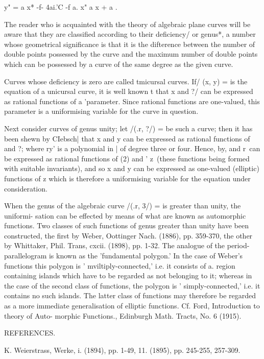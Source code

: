 {y" = a x* -f- 4ai.'C -f a. x" a x + a .

The reader who is acquainted with the theory of algebraic plane curves
will be aware that they are classified according to their deficiency/
or genus*, a number whose geometrical significance is that it is the
difterence between the number of double points possessed by the curve
and the maximum number of double points which can be possessed by a
curve of the same degree as the given curve.

Curves whose deficiency is zero are called tmicursal curves. If/ (x,
y) = is the equation of a unicursal curve, it is well known t that x
and ?/ can be expressed as rational functions of a 'parameter. Since
rational functions are one-valued, this parameter is a uniformising
variable for the curve in question.

Next consider curves of genus unity; let /(.r, ?/) = be such a curve;
then it has been shewn by CIebsch| that x and y can be expressed as
rational functions of and ?; where ry' is a polynomial in | of degree
three or four. Hence, by, and r\ can be expressed as rational
functions of (2) and ' z\ (these functions being formed with suitable
invariants), and so x and y can be expressed as one-valued (elliptic)
functions of z which is therefore a uniformising variable for the
equation under consideration.

When the genus of the algebraic curve /(.r, 3/) = is greater than
unity, the uniformi- sation can be effected by means of what are known
as automorphic functions. Two classes of such functions of genus
greater than unity have been constructed, the first by Weber,
Oottinger Nach. (1886), pp. 359-370, the other by Whittaker, Phil.
Trans, cxcii. (1898), pp. 1-32. The analogue of the
period-parallelogram is known as the 'fundamental polygon.' In the
case of Weber's functions this polygon is ' mviltiply-connected,' i.e.
it consists of a. region containing islands which have to be regarded
as not belonging to it; whereas in the case of the second class of
functions, the polygon is ' simply-connected,' i.e. it contains no
such islands. The latter class of functions may therefore be regarded
as a more immediate generalisation of elliptic functions. Cf. Ford,
Introduction to theory of Auto- morphic Functions., Edinburgh Math.
Tracts, No. 6 (1915).

REFERENCES.

K. Weierstrass, Werke, i. (1894), pp. 1-49, 11. (1895), pp. 245-255,
257-309.

}
